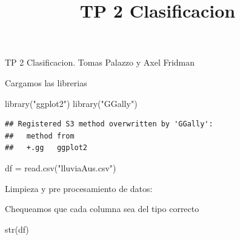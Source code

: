 \documentclass[
]{article}
\title{TP 2 Clasificacion}
\author{}
\date{\vspace{-2.5em}}
\newenvironment{Shaded}{\begin{snugshade}}{\end{snugshade}}
\newcommand{\CommentTok}[1]{\textcolor[rgb]{0.56,0.35,0.01}{\textit{#1}}}
\newcommand{\ConstantTok}[1]{\textcolor[rgb]{0.00,0.00,0.00}{#1}}
\newcommand{\FunctionTok}[1]{\textcolor[rgb]{0.00,0.00,0.00}{#1}}
\newcommand{\NormalTok}[1]{#1}
\newcommand{\OtherTok}[1]{\textcolor[rgb]{0.56,0.35,0.01}{#1}}
\newcommand{\SpecialCharTok}[1]{\textcolor[rgb]{0.00,0.00,0.00}{#1}}
\newcommand{\StringTok}[1]{\textcolor[rgb]{0.31,0.60,0.02}{#1}}
\begin{document}
\maketitle

TP 2 Clasificacion. Tomas Palazzo y Axel Fridman

Cargamos las librerias

\begin{Shaded}
\begin{Highlighting}[]
\FunctionTok{library}\NormalTok{(}\StringTok{"ggplot2"}\NormalTok{)                  }
\FunctionTok{library}\NormalTok{(}\StringTok{"GGally"}\NormalTok{)}
\end{Highlighting}
\end{Shaded}

\begin{verbatim}
## Registered S3 method overwritten by 'GGally':
##   method from   
##   +.gg   ggplot2
\end{verbatim}

\begin{Shaded}
\begin{Highlighting}[]
\NormalTok{df }\OtherTok{=} \FunctionTok{read.csv}\NormalTok{(}\StringTok{"lluviaAus.csv"}\NormalTok{)}
\end{Highlighting}
\end{Shaded}

Limpieza y pre procesamiento de datos:

\begin{Shaded}
\end{Shaded}

Chequeamos que cada columna sea del tipo correcto

\begin{Shaded}
\begin{Highlighting}[]
\FunctionTok{str}\NormalTok{(df) }
\end{Highlighting}
\end{Shaded}
\end{document}
